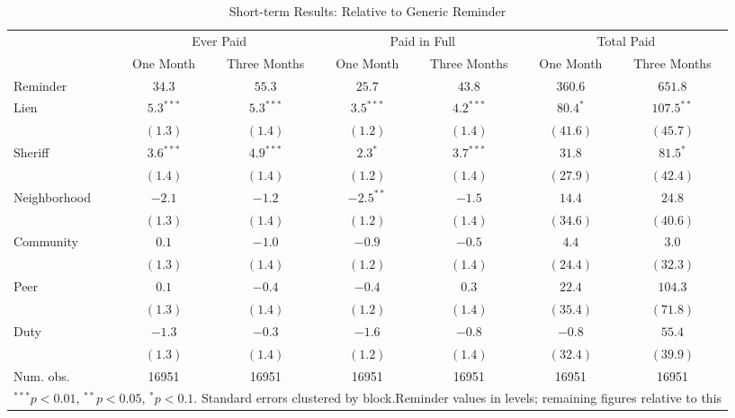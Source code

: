 \begin{table}[htb]
\caption{Short-term Results: Relative to Generic Reminder}
\begin{center}
\begin{tabular}{l c c c c c c }
\hline
 & \multicolumn{2}{c}{Ever Paid} & \multicolumn{2}{c}{Paid in Full} & \multicolumn{2}{c}{Total Paid} \\
 & One Month & Three Months & One Month & Three Months & One Month & Three Months \\
Reminder     & $34.3$ & $55.3$ & $25.7$ & $43.8$ & $360.6$ & $651.8$ \\
\hline
Lien         & $5.3^{***}$  & $5.3^{***}$  & $3.5^{***}$  & $4.2^{***}$  & $80.4^{*}$    & $107.5^{**}$  \\
             & $(1.3)$      & $(1.4)$      & $(1.2)$      & $(1.4)$      & $(41.6)$      & $(45.7)$      \\
Sheriff      & $3.6^{***}$  & $4.9^{***}$  & $2.3^{*}$    & $3.7^{***}$  & $31.8$        & $81.5^{*}$    \\
             & $(1.4)$      & $(1.4)$      & $(1.2)$      & $(1.4)$      & $(27.9)$      & $(42.4)$      \\
Neighborhood & $-2.1$       & $-1.2$       & $-2.5^{**}$  & $-1.5$       & $14.4$        & $24.8$        \\
             & $(1.3)$      & $(1.4)$      & $(1.2)$      & $(1.4)$      & $(34.6)$      & $(40.6)$      \\
Community    & $0.1$        & $-1.0$       & $-0.9$       & $-0.5$       & $4.4$         & $3.0$         \\
             & $(1.3)$      & $(1.4)$      & $(1.2)$      & $(1.4)$      & $(24.4)$      & $(32.3)$      \\
Peer         & $0.1$        & $-0.4$       & $-0.4$       & $0.3$        & $22.4$        & $104.3$       \\
             & $(1.3)$      & $(1.4)$      & $(1.2)$      & $(1.4)$      & $(35.4)$      & $(71.8)$      \\
Duty         & $-1.3$       & $-0.3$       & $-1.6$       & $-0.8$       & $-0.8$        & $55.4$        \\
             & $(1.3)$      & $(1.4)$      & $(1.2)$      & $(1.4)$      & $(32.4)$      & $(39.9)$      \\
\hline
Num. obs.    & 16951        & 16951        & 16951        & 16951        & 16951         & 16951         \\
\hline
\multicolumn{7}{l}{\scriptsize{$^{***}p<0.01$, $^{**}p<0.05$, $^*p<0.1$. Standard errors clustered by block.Reminder values in levels; remaining figures relative to this}}
\end{tabular}
\label{sh_lpm_rob}
\end{center}
\end{table}

